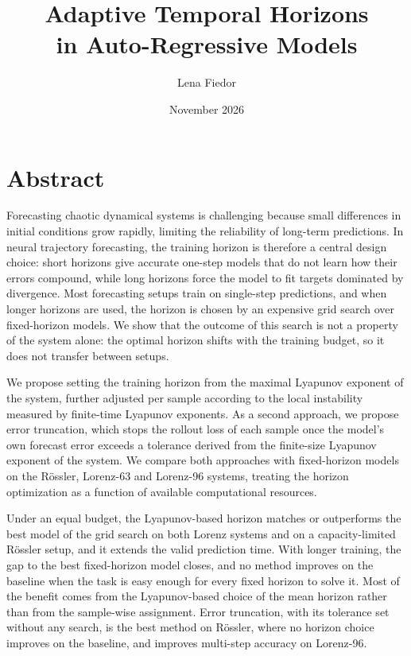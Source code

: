 \documentclass{article}
\title{Adaptive Temporal Horizons \\ in Auto-Regressive Models}
\author{Lena Fiedor}
\date{November 2026}
\begin{document}
\justifying
\maketitle

\section{Abstract}

Forecasting chaotic dynamical systems is challenging because small differences in initial conditions grow rapidly, limiting the reliability of long-term predictions. In neural trajectory forecasting, the training horizon is therefore a central design choice: short horizons give accurate one-step models that do not learn how their errors compound, while long horizons force the model to fit targets dominated by divergence. Most forecasting setups train on single-step predictions, and when longer horizons are used, the horizon is chosen by an expensive grid search over fixed-horizon models. We show that the outcome of this search is not a property of the system alone: the optimal horizon shifts with the training budget, so it does not transfer between setups.

We propose setting the training horizon from the maximal Lyapunov exponent of the system, further adjusted per sample according to the local instability measured by finite-time Lyapunov exponents. As a second approach, we propose error truncation, which stops the rollout loss of each sample once the model's own forecast error exceeds a tolerance derived from the finite-size Lyapunov exponent of the system. We compare both approaches with fixed-horizon models on the Rössler, Lorenz-63 and Lorenz-96 systems, treating the horizon optimization as a function of available computational resources.

Under an equal budget, the Lyapunov-based horizon matches or outperforms the best model of the grid search on both Lorenz systems and on a capacity-limited Rössler setup, and it extends the valid prediction time. With longer training, the gap to the best fixed-horizon model closes, and no method improves on the baseline when the task is easy enough for every fixed horizon to solve it. Most of the benefit comes from the Lyapunov-based choice of the mean horizon rather than from the sample-wise assignment. Error truncation, with its tolerance set without any search, is the best method on Rössler, where no horizon choice improves on the baseline, and improves multi-step accuracy on Lorenz-96.
\end{document}
